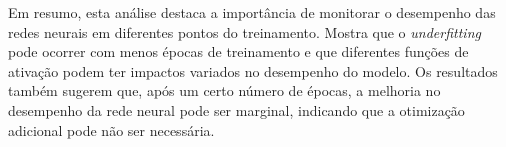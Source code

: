Em resumo, esta análise destaca a importância de monitorar o desempenho das 
redes neurais em diferentes pontos do treinamento. Mostra que o 
\textit{underfitting} 
pode ocorrer com menos épocas de treinamento e que diferentes funções de 
ativação podem ter impactos variados no desempenho do modelo. Os resultados 
também sugerem que, após um certo número de épocas, a melhoria no desempenho da 
rede neural pode ser marginal, indicando que a otimização adicional pode não 
ser necessária.
